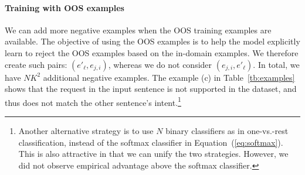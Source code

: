 \paragraph{Training with OOS examples}
We can add more negative examples when the OOS training examples are available.
The objective of using the OOS examples is to help the model explicitly learn to reject the OOS examples based on the in-domain examples.
We therefore create such pairs: $(e'_{\ell}, e_{j, i})$, whereas we do not consider $(e_{j, i}, e'_{\ell})$.
In total, we have $NK^2$ additional negative examples.
The example (c) in Table~\ref{tb:examples} shows that the request in the input sentence is not supported in the dataset, and thus does not match the other sentence's intent.\footnote{Another alternative strategy is to use $N$ binary classifiers as in one-vs.-rest classification, instead of the softmax classifier in Equation~(\ref{eq:softmax}).
This is also attractive in that we can unify the two strategies.
However, we did not observe empirical advantage above the softmax classifier.}
\fi